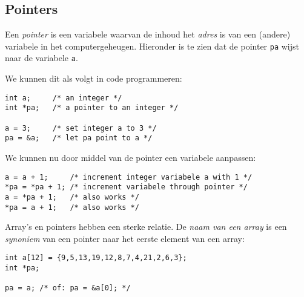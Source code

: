 \documentclass[a4paper,10pt,fleqn,twoside]{article}
\begin{document}
\subsection{Pointers}
Een \textsl{pointer} is een variabele waarvan de inhoud het \textsl{adres} is van een (andere) variabele in het computergeheugen. Hieronder is te zien dat de pointer \lstinline|pa| wijst naar de variabele \lstinline|a|.

\begin{figure}[!ht]
\centering
{}
\end{figure}

We kunnen dit als volgt in code programmeren:

\begin{lstlisting}
int a;     /* an integer */
int *pa;   /* a pointer to an integer */

a = 3;     /* set integer a to 3 */
pa = &a;   /* let pa point to a */
\end{lstlisting}

We kunnen nu door middel van de pointer een variabele aanpassen:

\begin{lstlisting}
a = a + 1;     /* increment integer variabele a with 1 */
*pa = *pa + 1; /* increment variabele through pointer */
a = *pa + 1;   /* also works */
*pa = a + 1;   /* also works */
\end{lstlisting}

Array's en pointers hebben een sterke relatie. De \textsl{naam van een array} is een \textsl{synoniem} van een pointer naar het eerste element van een array:

\begin{lstlisting}
int a[12] = {9,5,13,19,12,8,7,4,21,2,6,3};
int *pa;

pa = a; /* of: pa = &a[0]; */
\end{lstlisting}

\begin{figure}[!ht]
\centering
{}
\end{figure}
\end{document}
